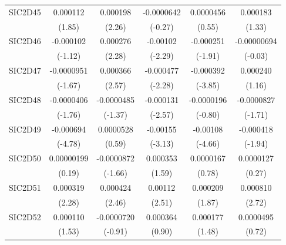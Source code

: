 \begin{table}[htbp]
\begin{tabular}{l*{5}{c}}
SIC2D45     &    0.000112         &    0.000198\sym{*}  &  -0.0000642         &   0.0000456         &    0.000183         \\
            &      (1.85)         &      (2.26)         &     (-0.27)         &      (0.55)         &      (1.33)         \\
SIC2D46     &   -0.000102         &    0.000276\sym{*}  &    -0.00102\sym{*}  &   -0.000251         & -0.00000694         \\
            &     (-1.12)         &      (2.28)         &     (-2.29)         &     (-1.91)         &     (-0.03)         \\
SIC2D47     &  -0.0000951         &    0.000366\sym{*}  &   -0.000477\sym{*}  &   -0.000392\sym{***}&    0.000240         \\
            &     (-1.67)         &      (2.57)         &     (-2.28)         &     (-3.85)         &      (1.16)         \\
SIC2D48     &  -0.0000406         &  -0.0000485         &   -0.000131\sym{*}  &  -0.0000196         &  -0.0000827         \\
            &     (-1.76)         &     (-1.37)         &     (-2.57)         &     (-0.80)         &     (-1.71)         \\
SIC2D49     &   -0.000694\sym{***}&   0.0000528         &    -0.00155\sym{**} &    -0.00108\sym{***}&   -0.000418         \\
            &     (-4.78)         &      (0.59)         &     (-3.13)         &     (-4.66)         &     (-1.94)         \\
SIC2D50     &  0.00000199         &  -0.0000872         &    0.000353         &   0.0000167         &   0.0000127         \\
            &      (0.19)         &     (-1.66)         &      (1.59)         &      (0.78)         &      (0.27)         \\
SIC2D51     &    0.000319\sym{*}  &    0.000424\sym{*}  &     0.00112\sym{*}  &    0.000209         &    0.000810\sym{**} \\
            &      (2.28)         &      (2.46)         &      (2.51)         &      (1.87)         &      (2.72)         \\
SIC2D52     &    0.000110         &  -0.0000720         &    0.000364         &    0.000177         &   0.0000495         \\
            &      (1.53)         &     (-0.91)         &      (0.90)         &      (1.48)         &      (0.72)         \\

\end{tabular}
\end{table}
